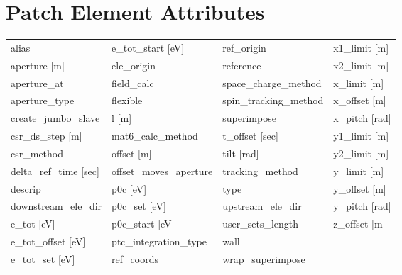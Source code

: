  \section{Patch Element Attributes}
 \label{s:list.patch}
 
 \begin{tabular}{llll} \toprule
alias                            & e_tot_start [eV]                 & ref_origin                       & x1_limit [m]                     \\
aperture [m]                     & ele_origin                       & reference                        & x2_limit [m]                     \\
aperture_at                      & field_calc                       & space_charge_method              & x_limit [m]                      \\
aperture_type                    & flexible                         & spin_tracking_method             & x_offset [m]                     \\
create_jumbo_slave               & l [m]                            & superimpose                      & x_pitch [rad]                    \\
csr_ds_step [m]                  & mat6_calc_method                 & t_offset [sec]                   & y1_limit [m]                     \\
csr_method                       & offset [m]                       & tilt [rad]                       & y2_limit [m]                     \\
delta_ref_time [sec]             & offset_moves_aperture            & tracking_method                  & y_limit [m]                      \\
descrip                          & p0c [eV]                         & type                             & y_offset [m]                     \\
downstream_ele_dir               & p0c_set [eV]                     & upstream_ele_dir                 & y_pitch [rad]                    \\
e_tot [eV]                       & p0c_start [eV]                   & user_sets_length                 & z_offset [m]                     \\
e_tot_offset [eV]                & ptc_integration_type             & wall                             &                                  \\
e_tot_set [eV]                   & ref_coords                       & wrap_superimpose                 &                                  \\
 \bottomrule
 \end{tabular}
 \vfill
 
